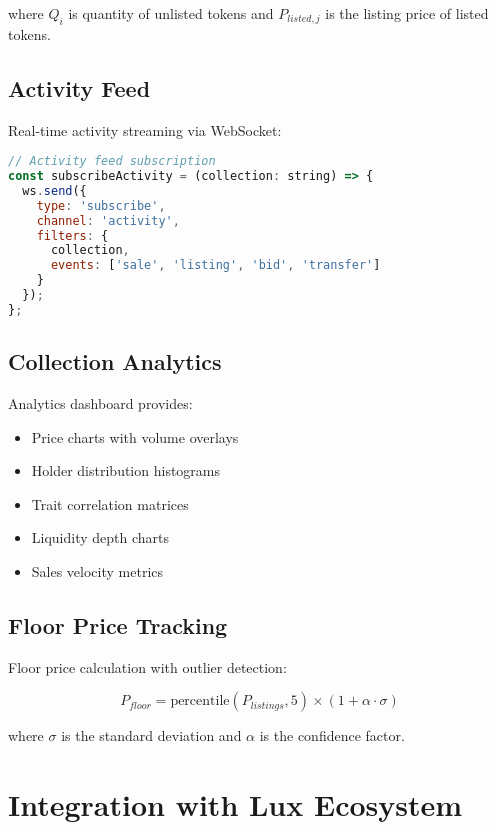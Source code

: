 \documentclass[11pt,a4paper]{article}
\begin{document}
where $Q_i$ is quantity of unlisted tokens and $P_{listed,j}$ is the listing price of listed tokens.

\subsection{Activity Feed}

Real-time activity streaming via WebSocket:

\begin{lstlisting}[language=JavaScript]
// Activity feed subscription
const subscribeActivity = (collection: string) => {
  ws.send({
    type: 'subscribe',
    channel: 'activity',
    filters: {
      collection,
      events: ['sale', 'listing', 'bid', 'transfer']
    }
  });
};
\end{lstlisting}

\subsection{Collection Analytics}

Analytics dashboard provides:

\begin{itemize}
\item Price charts with volume overlays
\item Holder distribution histograms
\item Trait correlation matrices
\item Liquidity depth charts
\item Sales velocity metrics
\end{itemize}

\subsection{Floor Price Tracking}

Floor price calculation with outlier detection:

\begin{equation}
P_{floor} = \text{percentile}(P_{listings}, 5) \times (1 + \alpha \cdot \sigma)
\end{equation}

where $\sigma$ is the standard deviation and $\alpha$ is the confidence factor.

\section{Integration with Lux Ecosystem}
\end{document}
